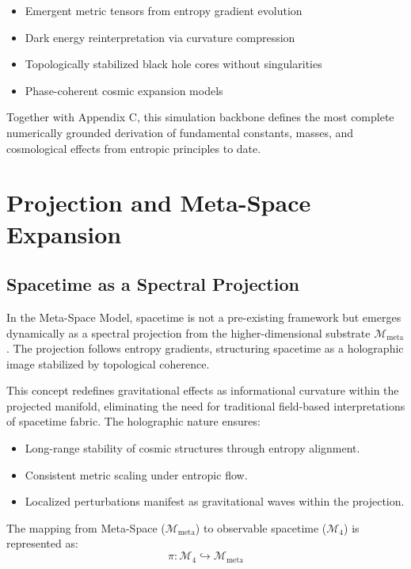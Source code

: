 \documentclass[10.5pt,a4paper]{article}
\begin{document}
\begin{itemize}
  \item Emergent metric tensors from entropy gradient evolution
  \item Dark energy reinterpretation via curvature compression
  \item Topologically stabilized black hole cores without singularities
  \item Phase-coherent cosmic expansion models
\end{itemize}

Together with Appendix C, this simulation backbone defines the most complete numerically grounded derivation of fundamental constants, masses, and cosmological effects from entropic principles to date.

\clearpage

\section{Projection and Meta-Space Expansion}

\subsection{Spacetime as a Spectral Projection}

In the Meta-Space Model, spacetime is not a pre-existing framework but emerges dynamically as a spectral projection 
from the higher-dimensional substrate \( \mathcal{M}_{\text{meta}} \). The projection follows entropy gradients, 
structuring spacetime as a holographic image stabilized by topological coherence.

This concept redefines gravitational effects as informational curvature within the projected manifold, eliminating 
the need for traditional field-based interpretations of spacetime fabric. The holographic nature ensures:
\begin{itemize}
    \item Long-range stability of cosmic structures through entropy alignment.
    \item Consistent metric scaling under entropic flow.
    \item Localized perturbations manifest as gravitational waves within the projection.
\end{itemize}

The mapping from Meta-Space (\( \mathcal{M}_{\text{meta}} \)) to observable spacetime (\( \mathcal{M}_4 \)) is represented as:
\[
    \pi: \mathcal{M}_4 \hookrightarrow \mathcal{M}_{\text{meta}}
\]
\end{document}
